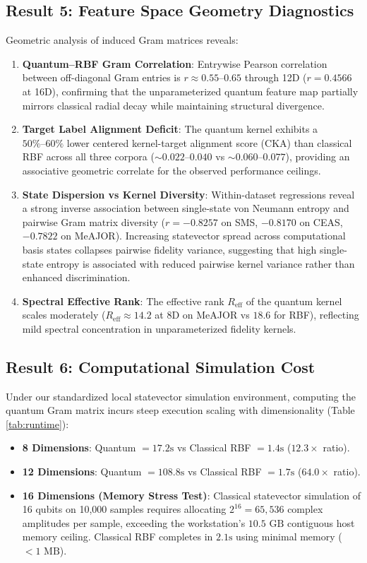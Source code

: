 \documentclass[10pt,twocolumn,letterpaper]{article}
\begin{document}
\subsection{Result 5: Feature Space Geometry Diagnostics}
Geometric analysis of induced Gram matrices reveals:
\begin{enumerate}
    \item \textbf{Quantum--RBF Gram Correlation}: Entrywise Pearson correlation between off-diagonal Gram entries is $r \approx 0.55\text{--}0.65$ through 12D ($r = 0.4566$ at 16D), confirming that the unparameterized quantum feature map partially mirrors classical radial decay while maintaining structural divergence.
    \item \textbf{Target Label Alignment Deficit}: The quantum kernel exhibits a $50\%\text{--}60\%$ lower centered kernel-target alignment score ($\text{CKA}$) than classical RBF across all three corpora ($\sim 0.022\text{--}0.040$ vs $\sim 0.060\text{--}0.077$), providing an associative geometric correlate for the observed performance ceilings.
    \item \textbf{State Dispersion vs Kernel Diversity}: Within-dataset regressions reveal a strong inverse association between single-state von Neumann entropy and pairwise Gram matrix diversity ($r = -0.8257$ on SMS, $-0.8170$ on CEAS, $-0.7822$ on MeAJOR). Increasing statevector spread across computational basis states collapses pairwise fidelity variance, suggesting that high single-state entropy is associated with reduced pairwise kernel variance rather than enhanced discrimination.
    \item \textbf{Spectral Effective Rank}: The effective rank $R_{\text{eff}}$ of the quantum kernel scales moderately ($R_{\text{eff}} \approx 14.2$ at 8D on MeAJOR vs $18.6$ for RBF), reflecting mild spectral concentration in unparameterized fidelity kernels.
\end{enumerate}

\subsection{Result 6: Computational Simulation Cost}
\label{sec:runtime_cost}
Under our standardized local statevector simulation environment, computing the quantum Gram matrix incurs steep execution scaling with dimensionality (Table \ref{tab:runtime}):
\begin{itemize}
    \item \textbf{8 Dimensions}: Quantum $= 17.2\text{s}$ vs Classical RBF $= 1.4\text{s}$ ($12.3\times$ ratio).
    \item \textbf{12 Dimensions}: Quantum $= 108.8\text{s}$ vs Classical RBF $= 1.7\text{s}$ ($64.0\times$ ratio).
    \item \textbf{16 Dimensions (Memory Stress Test)}: Classical statevector simulation of 16 qubits on 10,000 samples requires allocating $2^{16} = 65,536$ complex amplitudes per sample, exceeding the workstation's $10.5\text{ GB}$ contiguous host memory ceiling. Classical RBF completes in $2.1\text{s}$ using minimal memory ($<1\text{ MB}$).
\end{itemize}
\end{document}
